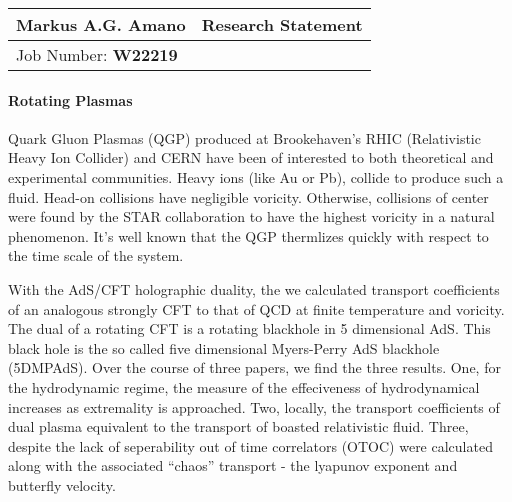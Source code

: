 \documentclass[12pt]{article}
\begin{document}
\begin{center}
  \begin{tabularx}{\textwidth} { 
      >{\raggedright\arraybackslash}X 
    >{\raggedleft\arraybackslash}X  }
    \huge Markus A.G. Amano & Research Statement\\
    \hline
    Job Number: \textbf{W22219} & \\
  \end{tabularx}
\end{center}


\paragraph{Rotating Plasmas}

Quark Gluon Plasmas (QGP) produced at Brookehaven's RHIC (Relativistic Heavy Ion Collider) and CERN have been of interested to both theoretical and experimental communities.
Heavy ions (like Au or Pb), collide to produce such a fluid.
Head-on collisions have negligible voricity.
Otherwise, collisions of center were found by the STAR collaboration to have the highest voricity in a natural phenomenon.
It's well known that the QGP thermlizes quickly with respect to the time scale of the system.

With the AdS/CFT holographic duality, the we calculated transport coefficients of an analogous strongly CFT to that of QCD at finite temperature and voricity.
The dual of a rotating CFT is a rotating blackhole in 5 dimensional AdS. 
This black hole is the so called five dimensional Myers-Perry AdS blackhole (5DMPAdS).
Over the course of three papers, we find the three results. 
One, for the hydrodynamic regime, the measure of the effeciveness of hydrodynamical increases as extremality is approached.
Two, locally, the transport coefficients of dual plasma equivalent to the transport of boasted relativistic fluid.
Three, despite the lack of seperability out of time correlators (OTOC) were calculated along with the associated ``chaos'' transport - the lyapunov exponent and butterfly velocity.
\end{document}
